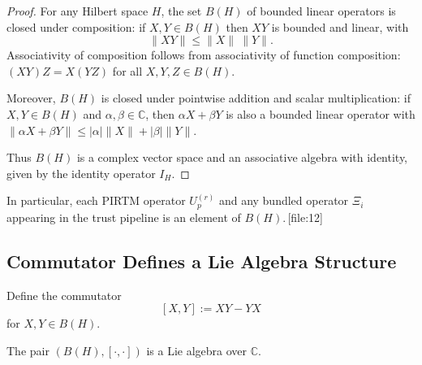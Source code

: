 \documentclass[11pt]{article}
\begin{document}
\begin{proof}
For any Hilbert space \(H\), the set \(B(H)\) of bounded linear operators is
closed under composition: if \(X,Y \in B(H)\) then \(XY\) is bounded and linear,
with
\[
  \|XY\| \le \|X\|\ \|Y\|.
\]
Associativity of composition follows from associativity of function
composition:
\((XY)Z = X(YZ)\) for all \(X,Y,Z \in B(H)\).

Moreover, \(B(H)\) is closed under pointwise addition and scalar
multiplication: if \(X,Y \in B(H)\) and \(\alpha,\beta \in \mathbb{C}\), then
\(\alpha X + \beta Y\) is also a bounded linear operator with
\(\|\alpha X + \beta Y\| \le |\alpha|\|X\| + |\beta|\|Y\|\).

Thus \(B(H)\) is a complex vector space and an associative algebra with
identity, given by the identity operator \(I_H\).
\end{proof}

In particular, each PIRTM operator \(U_p^{(r)}\) and any bundled operator
\(\Xi_i\) appearing in the trust pipeline is an element of \(B(H)\).\,[file:12]

\subsection{Commutator Defines a Lie Algebra Structure}

Define the commutator
\[
  [X,Y] := XY - YX
\]
for \(X,Y \in B(H)\).

\begin{proposition}
The pair \((B(H),[\cdot,\cdot])\) is a Lie algebra over \(\mathbb{C}\).
\end{proposition}
\end{document}
